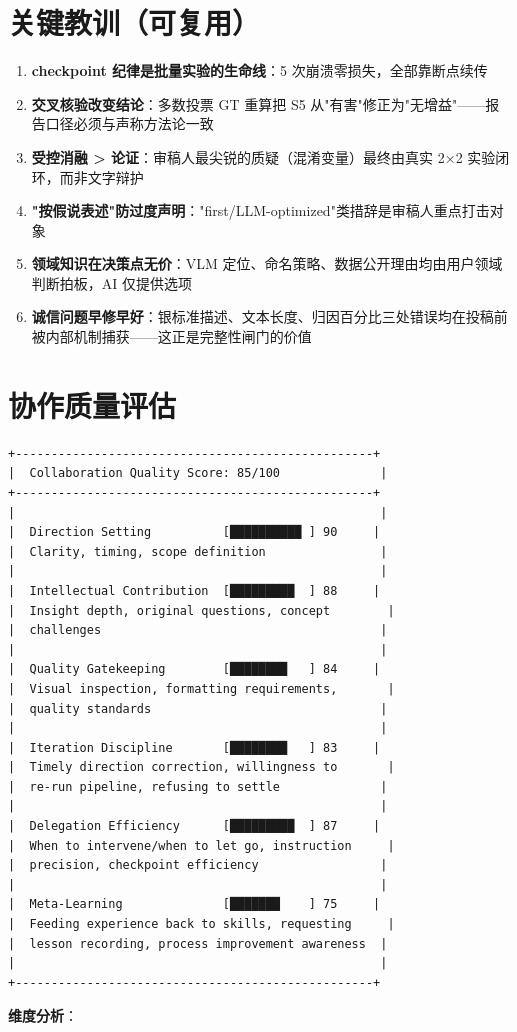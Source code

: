 \documentclass[11pt]{article}
\begin{document}
\section{{\cjkfont 关键教训（可复用）}}
\begin{enumerate}
\item \textbf{checkpoint {\cjkfont 纪律是批量实验的生命线}}{\cjkfont ：}5 {\cjkfont 次崩溃零损失，全部靠断点续传}
\item \textbf{{\cjkfont 交叉核验改变结论}}{\cjkfont ：多数投票} GT {\cjkfont 重算把} S5 {\cjkfont 从}"{\cjkfont 有害}"{\cjkfont 修正为}"{\cjkfont 无增益}"------{\cjkfont 报告口径必须与声称方法论一致}
\item \textbf{{\cjkfont 受控消融} > {\cjkfont 论证}}{\cjkfont ：审稿人最尖锐的质疑（混淆变量）最终由真实} 2$\times$2 {\cjkfont 实验闭环，而非文字辩护}
\item \textbf{"{\cjkfont 按假说表述}"{\cjkfont 防过度声明}}{\cjkfont ：}"first/LLM-optimized"{\cjkfont 类措辞是审稿人重点打击对象}
\item \textbf{{\cjkfont 领域知识在决策点无价}}{\cjkfont ：}VLM {\cjkfont 定位、命名策略、数据公开理由均由用户领域判断拍板，}AI {\cjkfont 仅提供选项}
\item \textbf{{\cjkfont 诚信问题早修早好}}{\cjkfont ：银标准描述、文本长度、归因百分比三处错误均在投稿前被内部机制捕获}------{\cjkfont 这正是完整性闸门的价值}
\end{enumerate}
\section{{\cjkfont 协作质量评估}}
\begin{verbatim}
+--------------------------------------------------+
|  Collaboration Quality Score: 85/100              |
+--------------------------------------------------+
|                                                   |
|  Direction Setting          [██████████ ] 90     |
|  Clarity, timing, scope definition                |
|                                                   |
|  Intellectual Contribution  [█████████  ] 88     |
|  Insight depth, original questions, concept        |
|  challenges                                       |
|                                                   |
|  Quality Gatekeeping        [████████   ] 84     |
|  Visual inspection, formatting requirements,       |
|  quality standards                                |
|                                                   |
|  Iteration Discipline       [████████   ] 83     |
|  Timely direction correction, willingness to       |
|  re-run pipeline, refusing to settle              |
|                                                   |
|  Delegation Efficiency      [█████████  ] 87     |
|  When to intervene/when to let go, instruction     |
|  precision, checkpoint efficiency                 |
|                                                   |
|  Meta-Learning              [███████    ] 75     |
|  Feeding experience back to skills, requesting     |
|  lesson recording, process improvement awareness  |
|                                                   |
+--------------------------------------------------+
\end{verbatim}
\textbf{{\cjkfont 维度分析}}{\cjkfont ：}
\end{document}
